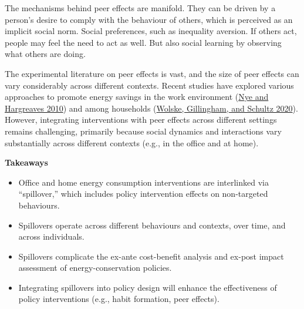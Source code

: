 \documentclass[
  11pt,
  captions=heading]{scrreport}
\begin{document}
The mechanisms behind peer effects are manifold. They can be driven by a
person's desire to comply with the behaviour of others, which is
perceived as an implicit social norm. Social preferences, such as
inequality aversion. If others act, people may feel the need to act as
well. But also social learning by observing what others are doing.

The experimental literature on peer effects is vast, and the size of
peer effects can vary considerably across different contexts. Recent
studies have explored various approaches to promote energy savings in
the work environment (\protect\hyperlink{ref-nye2010exploring}{Nye and
Hargreaves 2010}) and among households
(\protect\hyperlink{ref-wolske2020peer}{Wolske, Gillingham, and Schultz
2020}). However, integrating interventions with peer effects across
different settings remains challenging, primarily because social
dynamics and interactions vary substantially across different contexts
(e.g., in the office and at home).

\textbf{Takeaways}

\begin{itemize}
\item
  Office and home energy consumption interventions are interlinked via
  ``spillover,'' which includes policy intervention effects on
  non-targeted behaviours.
\item
  Spillovers operate across different behaviours and contexts, over
  time, and across individuals.
\item
  Spillovers complicate the ex-ante cost-benefit analysis and ex-post
  impact assessment of energy-conservation policies.
\item
  Integrating spillovers into policy design will enhance the
  effectiveness of policy interventions (e.g., habit formation, peer
  effects).
\end{itemize}
\end{document}
